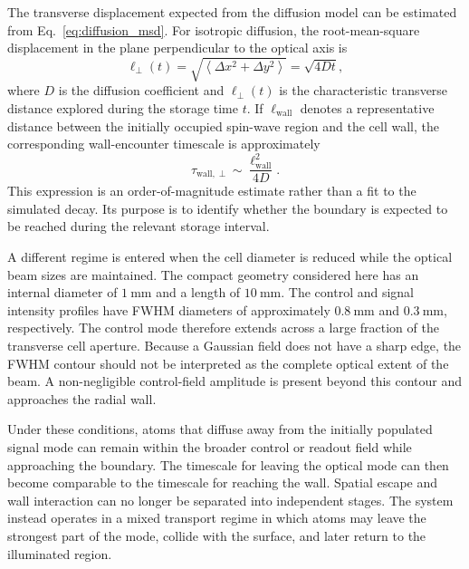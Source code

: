 The transverse displacement expected from the diffusion model can be estimated from Eq.~\eqref{eq:diffusion_msd}. For isotropic diffusion, the root-mean-square displacement in the plane perpendicular to the optical axis is~\cite{MonteCarloNotes}
\begin{equation}
\ell_{\perp}(t)
=
\sqrt{
\left\langle
\Delta x^2+\Delta y^2
\right\rangle
}
=
\sqrt{4Dt},
\label{eq:results_transverse_diffusion_length}
\end{equation}
where $D$ is the diffusion coefficient and $\ell_{\perp}(t)$ is the characteristic transverse distance explored during the storage time $t$. If $\ell_{\mathrm{wall}}$ denotes a representative distance between the initially occupied spin-wave region and the cell wall, the corresponding wall-encounter timescale is approximately
\begin{equation}
\tau_{\mathrm{wall},\perp}
\sim
\frac{\ell_{\mathrm{wall}}^2}{4D}.
\label{eq:results_transverse_wall_time}
\end{equation}
This expression is an order-of-magnitude estimate rather than a fit to the simulated decay. Its purpose is to identify whether the boundary is expected to be reached during the relevant storage interval.

A different regime is entered when the cell diameter is reduced while the optical beam sizes are maintained. The compact geometry considered here has an internal diameter of $\SI{1}{\milli\metre}$ and a length of $\SI{10}{\milli\metre}$. The control and signal intensity profiles have FWHM diameters of approximately $\SI{0.8}{\milli\metre}$ and $\SI{0.3}{\milli\metre}$, respectively. The control mode therefore extends across a large fraction of the transverse cell aperture. Because a Gaussian field does not have a sharp edge, the FWHM contour should not be interpreted as the complete optical extent of the beam. A non-negligible control-field amplitude is present beyond this contour and approaches the radial wall.

Under these conditions, atoms that diffuse away from the initially populated signal mode can remain within the broader control or readout field while approaching the boundary. The timescale for leaving the optical mode can then become comparable to the timescale for reaching the wall. Spatial escape and wall interaction can no longer be separated into independent stages. The system instead operates in a mixed transport regime in which atoms may leave the strongest part of the mode, collide with the surface, and later return to the illuminated region.

